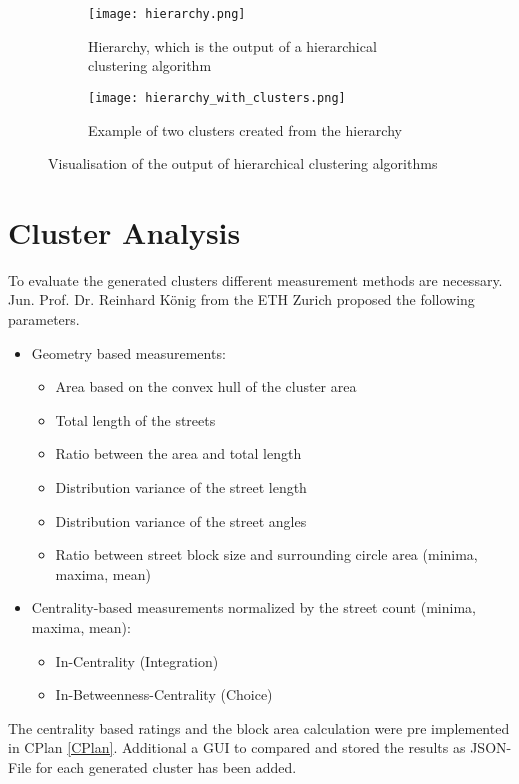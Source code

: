 \begin{figure}[!hb]
    \centering
    \begin{subfigure}[b]{\textwidth}
        \begin{mdframed}[style=border]
            \texttt{[image: hierarchy.png]}
        \end{mdframed}
        \caption{Hierarchy, which is the output of a hierarchical clustering algorithm}
        \label{fig:hierarchy}
    \end{subfigure}
    \par\medskip
    \begin{subfigure}[b]{\textwidth}
        \begin{mdframed}[style=border]
            \texttt{[image: hierarchy\_with\_clusters.png]}
        \end{mdframed}
        \caption{Example of two clusters created from the hierarchy}
        \label{fig:hierarchy_with_clusters}
    \end{subfigure}
    \caption{Visualisation of the output of hierarchical clustering algorithms}
\end{figure}


\section{Cluster Analysis}
\label{sec:clusterRating}
To evaluate the generated clusters different measurement methods are necessary. Jun. Prof. Dr. Reinhard König from the ETH Zurich proposed the following parameters.

\begin{itemize}
    \item Geometry based measurements:
    \begin{itemize}
        \item Area based on the convex hull of the cluster area
        \item Total length of the streets
        \item Ratio between the area and total length
        \item Distribution variance of the street length
        \item Distribution variance of the street angles
        \item Ratio between street block size and surrounding circle area (minima, maxima, mean)
    \end{itemize}
    \item Centrality-based measurements normalized by the street count (minima, maxima, mean):
    \begin{itemize}
        \item In-Centrality (Integration)
        \item In-Betweenness-Centrality (Choice)
    \end{itemize}
\end{itemize}
The centrality based ratings and the block area calculation were pre implemented in CPlan \ref{CPlan}. Additional a GUI to compared and stored the results as JSON-File for each generated cluster has been added.

